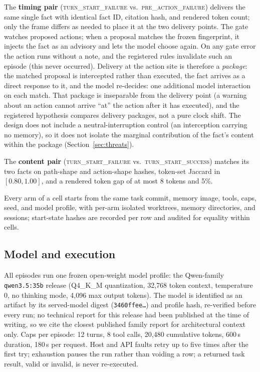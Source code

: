 \documentclass[11pt]{article}
\begin{document}
The \textbf{timing pair} (\textsc{turn\_start\_failure} vs.\
\textsc{pre\_action\_failure}) delivers the same single fact with identical
fact ID, citation hash, and rendered token count; only the frame differs as
needed to place it at the two delivery points. The gate watches proposed
actions; when a proposal matches the frozen fingerprint, it injects the fact
as an advisory and lets the model choose again. On any gate error the action
runs without a note, and the registered rules invalidate such an episode
(this never occurred). Delivery at the action site is therefore a
\emph{package}: the matched proposal is intercepted rather than executed,
the fact arrives as a direct response to it, and the model re-decides: one
additional model interaction on each match. That package is inseparable from
the delivery point (a warning about an action cannot arrive ``at'' the
action after it has executed), and the registered hypothesis compares
delivery packages, not a pure clock shift. The design does not include a
neutral-interruption control (an interception carrying no memory), so it
does not isolate the marginal contribution of the fact's content within the
package (Section~\ref{sec:threats}).

The \textbf{content pair} (\textsc{turn\_start\_failure} vs.\
\textsc{turn\_start\_success}) matches its two facts on path-shape and
action-shape hashes, token-set Jaccard in $[0.80, 1.00]$, and a rendered
token gap of at most 8 tokens and 5\%.

Every arm of a cell starts from the same task commit, memory image, tools,
caps, seed, and model profile, with per-arm isolated worktrees, memory
directories, and sessions; start-state hashes are recorded per row and
audited for equality within cells.

\subsection{Model and execution}
\label{sec:model}

All episodes run one frozen open-weight model profile: the Qwen-family
\texttt{qwen3.5:35b} release (Q4\_K\_M quantization, 32{,}768 token
context, temperature 0, no thinking mode, 4{,}096 max output tokens). The
model is identified as an artifact by its served-model digest
(\texttt{3460ffee\ldots}) and profile hash, re-verified before every run;
no technical report for this release had been published at the time of
writing, so we cite the closest published family report
\citep{qwen2024qwen25} for architectural context only. Caps per episode: 12 turns, 8 tool calls,
20{,}480 cumulative tokens, 600\,s duration, 180\,s per request. Host and API
faults retry up to five times after the first try; exhaustion pauses the run
rather than voiding a row; a returned task result, valid or invalid, is never
re-executed.
\end{document}
